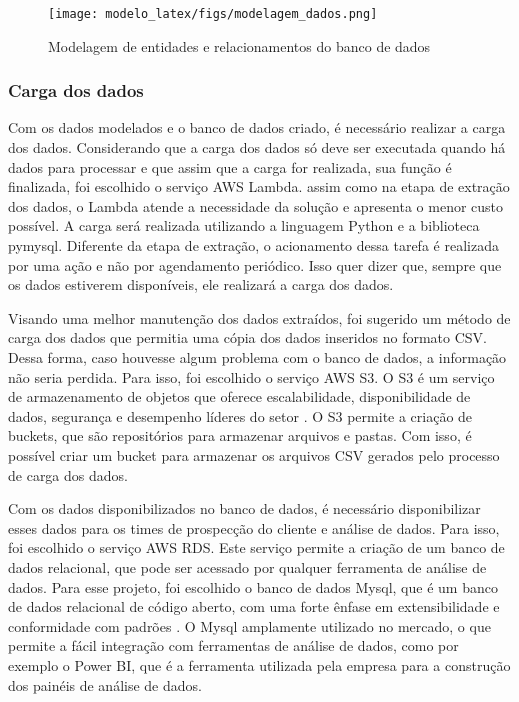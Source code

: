 \begin{figure}[H]
    \centering
    \texttt{[image: modelo\_latex/figs/modelagem\_dados.png]}
    \caption{Modelagem de entidades e relacionamentos do banco de dados}
    \label{fig:diagrama_er}
\end{figure}

\subsubsection{Carga dos dados}

Com os dados modelados e o banco de dados criado, é necessário realizar a carga dos dados. Considerando que a carga dos dados só deve ser executada quando há dados para processar e que assim que a carga for realizada, sua função é finalizada, foi escolhido o serviço AWS Lambda. assim como na etapa de extração dos dados, o Lambda atende a necessidade da solução e apresenta o menor custo possível. A carga será realizada utilizando a linguagem Python e a biblioteca pymysql. Diferente da etapa de extração, o acionamento dessa tarefa é realizada por uma ação e não por agendamento periódico. Isso quer dizer que, sempre que os dados estiverem disponíveis, ele realizará a carga dos dados.

Visando uma melhor manutenção dos dados extraídos, foi sugerido um método de carga dos dados que permitia uma cópia dos dados inseridos no formato CSV. Dessa forma, caso houvesse algum problema com o banco de dados, a informação não seria perdida. Para isso, foi escolhido o serviço AWS S3. O S3 é um serviço de armazenamento de objetos que oferece escalabilidade, disponibilidade de dados, segurança e desempenho líderes do setor \cite{S3}. O S3 permite a criação de buckets, que são repositórios para armazenar arquivos e pastas. Com isso, é possível criar um bucket para armazenar os arquivos CSV gerados pelo processo de carga dos dados.

Com os dados disponibilizados no banco de dados, é necessário disponibilizar esses dados para os times de prospecção do cliente e análise de dados. Para isso, foi escolhido o serviço AWS RDS. Este serviço permite a criação de um banco de dados relacional, que pode ser acessado por qualquer ferramenta de análise de dados. Para esse projeto, foi escolhido o banco de dados Mysql, que é um banco de dados relacional de código aberto, com uma forte ênfase em extensibilidade e conformidade com padrões \cite{MySQL}. O Mysql amplamente utilizado no mercado, o que permite a fácil integração com ferramentas de análise de dados, como por exemplo o Power BI, que é a ferramenta utilizada pela empresa para a construção dos painéis de análise de dados.

